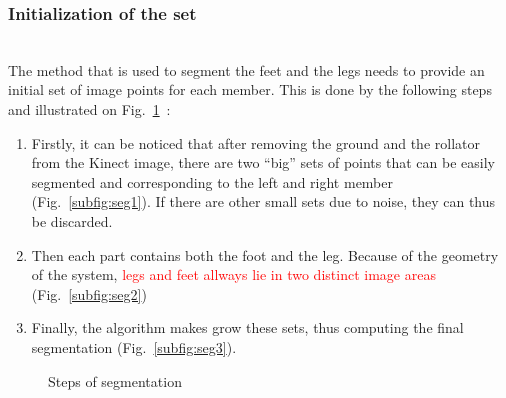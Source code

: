 \documentclass[letterpaper, 10 pt, conference]{ieeeconf}
\newcommand{\CD}[2]{\textcolor{red}{#1}} %
\begin{document}
\subsubsection{Initialization of the set}~\\
The method that is used to segment the feet and the legs needs to provide an initial set of image points for each member. This is done by the following steps and illustrated on Fig.~\ref{fig:segmentation}~:
\begin{enumerate}
	\item Firstly, it can be noticed that after removing the ground and the rollator from the Kinect image, there are two ``big'' sets of points that can be easily segmented and corresponding to the left and right member (Fig.~\ref{subfig:seg1}). If there are other small sets due to noise, they can thus be discarded.
	\item Then each part contains both the foot and the leg. Because of the geometry of the system, \CD{legs and feet allways lie in two distinct image areas}{ the bottom part corresponds systematically to the leg. Thus, we chose to initialize the leg with the last bottom quarter and the foot with the first bottom quarter}  (Fig.~\ref{subfig:seg2})
	\item Finally, the algorithm makes grow these sets, thus computing the final segmentation (Fig.~\ref{subfig:seg3}).
\end{enumerate}
\begin{figure}
	\centering
	\hfill
	 \hfill
	\caption{Steps of segmentation}
	\label{fig:segmentation}
\end{figure}
\end{document}

